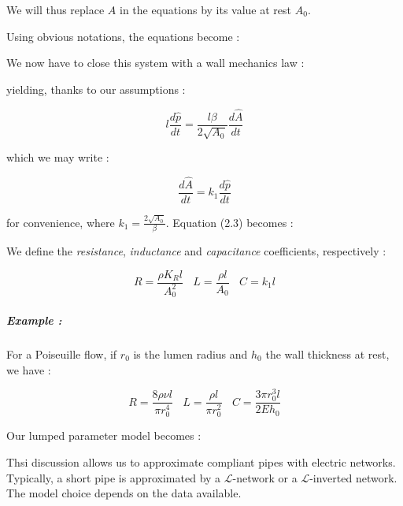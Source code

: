 \documentclass[a4paper]{article}
\begin{document}
\noindent We will thus replace $A$ in the equations by its value at rest $A_0$.

\bigskip

\noindent Using obvious notations, the equations become :


\noindent We now have to close this system with a wall mechanics law :


\noindent yielding, thanks to our assumptions :

$$l\frac{d\hat p}{dt}=\frac{l\beta}{2\sqrt{A_0}}\frac{d\hat A}{dt}$$

\noindent which we may write :

$$\frac{d\hat A}{dt}=k_1\frac{d\hat p}{dt}$$

\noindent for convenience, where $k_1=\frac{2\sqrt{A_0}}{\beta}$. Equation (2.3) becomes :


 We define the \emph{resistance}, \emph{inductance} and \emph{capacitance} coefficients, respectively :

$$R=\frac{\rho K_R l}{A_0^2}~~~~L=\frac{\rho l}{A_0}~~~~C=k_1l$$

\subparagraph{Example :} For a Poiseuille flow, if $r_0$ is the lumen radius and $h_0$ the wall thickness at rest, we have :

$$R=\frac{8\rho\nu l}{\pi r_0^4}~~~~L=\frac{\rho l}{\pi r_0^2}~~~~C=\frac{3\pi r_0^3l}{2Eh_0}$$

Our lumped parameter model becomes :


\bigskip

Thsi discussion allows us to approximate compliant pipes with electric networks. Typically, a short pipe is approximated by a $\mathcal L$-network or a $\mathcal L$-inverted network. The model choice depends on the data available.
\end{document}
